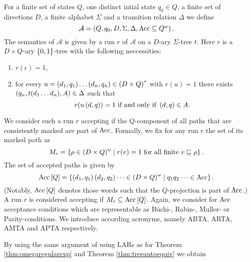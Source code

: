 \begin{definition}
  For a finite set of states $Q$, one distinct intial state $q_{0}\in Q$, a
  finite set of directions $D$, a finite alphabet $\Sigma$ and a transition
  relation $\Delta$ we define 
  \begin{equation*}
    \mathcal{A} = \left(Q, q_{0}, D, \Sigma, \Delta, \operatorname{Acc}\subseteq Q^{\omega}\right).
  \end{equation*}
  The semantics of $\mathcal{A}$ is given by a run $r$ of $\mathcal{A}$ on a
  $D$-ary $\Sigma$-tree $t$. Here $r$ is a $D\times Q$-ary $\left\{0,1\right\}$-tree 
  with the following neccessities:
  \begin{enumerate}
    \item $r(\epsilon) = 1$,
    \item for every $u = \left(d_{1}, q_{1}\right)\dots\left(d_{n}, q_{n}\right)\in
      \left(D\times Q\right)^{*}$ with $r(u) = 1$ there exists
      $\left(q_{n}, t(d_{1}\dots d_{n}), A\right)\in\Delta$ such that
      \begin{equation*}
        r(u\left(d, q\right)) = 1\text{ if and only if }\left(d, q\right)\in A.
      \end{equation*}
  \end{enumerate}
  We consider such a run $r$ accepting if the $Q$-component of all paths that 
  are consistently marked are part of $\operatorname{Acc}$. Formally, we fix for any run $r$ 
  the set of its marked path as
  \begin{equation*}
    M_{r} = \left\{
      \rho\in\left(D\times Q\right)^{\omega}\mid r(v) = 1\text{ for all finite }
        v\sqsubseteq\rho
    \right\}.
  \end{equation*}
  The set of accepted paths is given by
  \begin{equation*}
    \operatorname{Acc}\left[Q\right] = \left\{
      \left(d_{1}, q_{1}\right)\left(d_{2}, q_{2}\right)\dots\in
      \left(D\times Q\right)^{\omega}\mid q_{1}q_{2}\dots\in\operatorname{Acc}
    \right\}.
  \end{equation*}
  (Notably, $\operatorname{Acc}\left[Q\right]$ denotes those words such that the $Q$-projection
  is part of $\operatorname{Acc}$.) A run $r$ is considered accepting if
  $M_{r}\subseteq\operatorname{Acc}\left[Q\right]$. Again, we consider for $\operatorname{Acc}$ acceptance
  conditions which are representable as Büchi-, Rabin-, Muller- or
  Parity-conditions. We introduce according acronyms, namely \ac{ABTA},
  \ac{ARTA}, \ac{AMTA} and \ac{APTA} respectively.
\end{definition}
By using the same argument of using \acp{LAR} as for Theorem 
\ref{thm:omegaregularexp} and Theorem \ref{thm:treeautoequiv} we obtain
